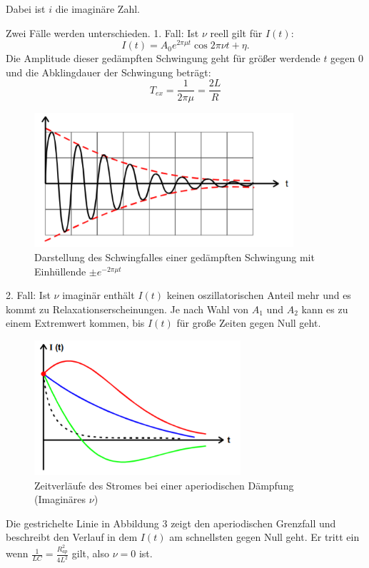 Dabei ist $i$ die imaginäre Zahl.

Zwei Fälle werden unterschieden.
1. Fall: Ist $\nu$ reell gilt für $I(t)$:
\begin{equation}
  I(t) = A_0 e^{2\pi \mu t} \cos{2\pi \nu t + \eta}.
\end{equation}
Die Amplitude dieser gedämpften Schwingung geht für größer werdende $t$ gegen $0$ und die
Abklingdauer der Schwingung beträgt:
\begin{equation}
  T_{ex} =\frac{1}{2\pi \mu} = \frac{2L}{R}
\end{equation}

\begin{figure}[H]
  \centering
  \includegraphics[height=5cm]{schwingfall.PNG}
  \caption{Darstellung des Schwingfalles einer gedämpften Schwingung mit Einhüllende $\pm e^{-2\pi \mu t}$}
  \label{fig:schwingfall}
\end{figure}

2. Fall: Ist $\nu$ imaginär enthält $I(t)$ keinen oszillatorischen Anteil mehr und es kommt
zu Relaxationserscheinungen. Je nach Wahl von $A_1$ und $A_2$ kann es zu einem Extremwert kommen, bis
$I(t)$ für große Zeiten gegen Null geht.

\begin{figure}[H]
  \centering
  \includegraphics[height=5cm]{grenzfall.PNG}
  \caption{Zeitverläufe des Stromes bei einer aperiodischen Dämpfung (Imaginäres $\nu$)}
  \label{fig:grenzfall}
\end{figure}

Die gestrichelte Linie in Abbildung 3 zeigt den aperiodischen Grenzfall und beschreibt den Verlauf
in dem $I(t)$ am schnellsten gegen Null geht. Er tritt ein wenn $\frac{1}{LC}=\frac{R_{ap}^2}{4L^2}$ gilt, also $\nu = 0$ ist.


